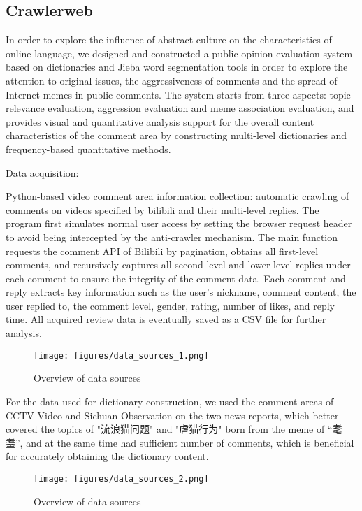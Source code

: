 \documentclass[12pt,a4paper]{ctexart}
\theoremstyle{MyLineTheoremStyle}
\theoremstyle{MyBlockTheoremStyle}
\theoremstyle{MySubsubsectionStyle}
\begin{document}
\subsection{Crawlerweb}

In order to explore the influence of abstract culture on the characteristics of online language, we designed and constructed a public opinion evaluation system based on dictionaries and Jieba word segmentation tools in order to explore the attention to original issues, the aggressiveness of comments and the spread of Internet memes in public comments. The system starts from three aspects: topic relevance evaluation, aggression evaluation and meme association evaluation, and provides visual and quantitative analysis support for the overall content characteristics of the comment area by constructing multi-level dictionaries and frequency-based quantitative methods.

Data acquisition:

Python-based video comment area information collection: automatic crawling of comments on videos specified by bilibili and their multi-level replies. The program first simulates normal user access by setting the browser request header to avoid being intercepted by the anti-crawler mechanism. The main function requests the comment API of Bilibili by pagination, obtains all first-level comments, and recursively captures all second-level and lower-level replies under each comment to ensure the integrity of the comment data. Each comment and reply extracts key information such as the user's nickname, comment content, the user replied to, the comment level, gender, rating, number of likes, and reply time. All acquired review data is eventually saved as a CSV file for further analysis.

\begin{figure}[htbp]
    \centering
    \texttt{[image: figures/data\_sources\_1.png]}
    \caption{Overview of data sources}
    \label{fig:data_sources_1}
\end{figure}
\newpage

For the data used for dictionary construction, we used the comment areas of CCTV Video and Sichuan Observation on the two news reports, which better covered the topics of "流浪猫问题" and "虐猫行为" born from the meme of “耄耋”, and at the same time had sufficient number of comments, which is beneficial for accurately obtaining the dictionary content.

\begin{figure}[htbp]
    \centering
    \texttt{[image: figures/data\_sources\_2.png]}
    \caption{Overview of data sources}
    \label{fig:data_sources_2}
\end{figure}
\newpage
\end{document}
